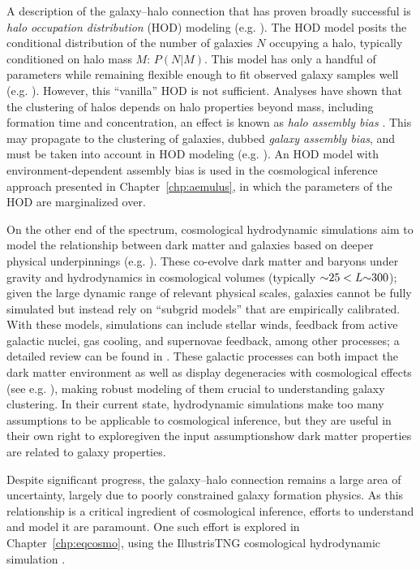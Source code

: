 A description of the galaxy--halo connection that has proven broadly successful is \emph{halo occupation distribution} (HOD) modeling (e.g. \citealt{peacock_halo_2000,Seljak2000,BerlindWeinberg2002}). 
The HOD model posits the conditional distribution of the number of galaxies $N$ occupying a halo, typically conditioned on halo mass $M$: $P(N|M)$.
This model has only a handful of parameters while remaining flexible enough to fit observed galaxy samples well (e.g. \citealt{Zheng2005,reddick_connection_2013}).
However, this ``vanilla'' HOD is not sufficient.
Analyses have shown that the clustering of halos depends on halo properties beyond mass, including formation time and concentration, an effect is known as \emph{halo assembly bias} \citep{wechsler_concentrations_2002, Wechsler2006,mao_beyond_2018}.
This may propagate to the clustering of galaxies, dubbed \emph{galaxy assembly bias}, and must be taken into account in HOD modeling (e.g. \citealt{Tinker2008,hearin_introducing_2016}).
An HOD model with environment-dependent assembly bias is used in the cosmological inference approach presented in Chapter~\ref{chp:aemulus}, in which the parameters of the HOD are marginalized over.

On the other end of the spectrum, cosmological hydrodynamic simulations aim to model the relationship between dark matter and galaxies based on deeper physical underpinnings (e.g. \citealt{springel_gadget_2001, genel_introducing_2014,dave_simba_2019}).
These co-evolve dark matter and baryons under gravity and hydrodynamics in cosmological volumes (typically $\mathord{\sim} 25 < L \mathord{\sim} 300$); given the large dynamic range of relevant physical scales, galaxies cannot be fully simulated but instead rely on ``subgrid models'' that are empirically calibrated.
With these models, simulations can include stellar winds, feedback from active galactic nuclei, gas cooling, and supernovae feedback, among other processes; a detailed review can be found in \cite{somerville_physical_2015}.
These galactic processes can both impact the dark matter environment as well as display degeneracies with cosmological effects (see e.g. \citealt{villaescusa-navarro_camels_2021}), making robust modeling of them crucial to understanding galaxy clustering.
In their current state, hydrodynamic simulations make too many assumptions to be applicable to cosmological inference, but they are useful in their own right to explore{\emdash}given the input assumptions{\emdash}how dark matter properties are related to galaxy properties.

Despite significant progress, the galaxy--halo connection remains a large area of uncertainty, largely due to poorly constrained galaxy formation physics.
As this relationship is a critical ingredient of cosmological inference, efforts to understand and model it are paramount.
One such effort is explored in Chapter~\ref{chp:eqcosmo}, using the IllustrisTNG cosmological hydrodynamic simulation \citep{springel_first_2018,nelson_first_2018,pillepich_first_2018,naiman_first_2018,marinacci_first_2018}. 



